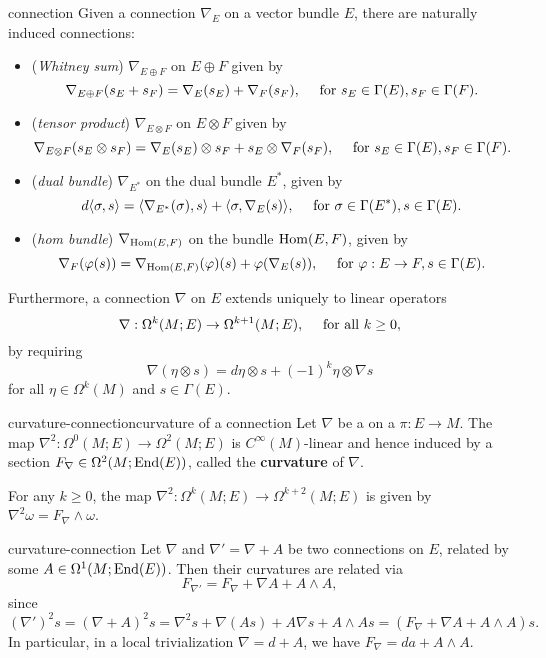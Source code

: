 \begin{example}{connection}
    Given a connection $\nabla_E$ on a vector bundle $E$, there are naturally induced connections:
    \begin{itemize}
        \item (\textit{Whitney sum}) $\nabla_{E \oplus F}$ on $E \oplus F$ given by
        \[ \nabla_{E \oplus F}(s_E + s_F) = \nabla_E(s_E) + \nabla_F(s_F), \quad \textup{ for } s_E \in \Gamma(E), s_F \in \Gamma(F) . \]
        \item (\textit{tensor product}) $\nabla_{E \otimes F}$ on $E \otimes F$ given by
        \[ \nabla_{E \otimes F}(s_E \otimes s_F) = \nabla_E(s_E) \otimes s_F + s_E \otimes \nabla_F(s_F), \quad \textup{ for } s_E \in \Gamma(E), s_F \in \Gamma(F) . \]
        \item (\textit{dual bundle}) $\nabla_{E^*}$ on the dual bundle $E^*$, given by
        \[ d \langle \sigma, s \rangle = \langle \nabla_{E^*} (\sigma), s \rangle + \langle \sigma, \nabla_E(s) \rangle, \quad \textup{ for } \sigma \in \Gamma(E^*), s \in \Gamma(E) . \]
        \item (\textit{hom bundle}) $\nabla_{\operatorname{Hom}(E, F)}$ on the bundle $\operatorname{Hom}(E, F)$, given by
        \[ \nabla_F(\varphi(s)) = \nabla_{\operatorname{Hom}(E, F)}(\varphi)(s) + \varphi(\nabla_E(s)), \quad \textup{ for } \varphi : E \to F, s \in \Gamma(E) . \]
    \end{itemize}
    Furthermore, a connection $\nabla$ on $E$ extends uniquely to linear operators
    \[ \nabla : \Omega^k(M; E) \to \Omega^{k + 1}(M; E), \quad \textup{ for all } k \ge 0,  \]
    by requiring
    \[ \nabla (\eta \otimes s) = d \eta \otimes s + (-1)^k \eta \otimes \nabla s \]
    for all $\eta \in \Omega^k(M)$ and $s \in \Gamma(E)$.
\end{example}

\begin{topic}{curvature-connection}{curvature of a connection}
    Let $\nabla$ be a  on a  $\pi : E \to M$. The map $\nabla^2 : \Omega^0(M; E) \to \Omega^2(M; E)$ is $C^\infty(M)$-linear and hence induced by a section $F_\nabla \in \Omega^2(M; \textup{End}(E))$, called the \textbf{curvature} of $\nabla$.
    
    For any $k \ge 0$, the map $\nabla^2 : \Omega^k(M; E) \to \Omega^{k + 2}(M; E)$ is given by $\nabla^2 \omega = F_\nabla \wedge \omega$.
\end{topic}

\begin{example}{curvature-connection}
    Let $\nabla$ and $\nabla' = \nabla + A$ be two connections on $E$, related by some $A \in \Omega^1(M; \textup{End}(E))$. Then their curvatures are related via
    \[ F_{\nabla'} = F_\nabla + \nabla A + A \wedge A , \]
    since
    \[ (\nabla')^2 s = (\nabla + A)^2 s = \nabla^2 s + \nabla (As) + A \nabla s + A \wedge A s = (F_\nabla + \nabla A + A \wedge A) s . \]
    In particular, in a local trivialization $\nabla = d + A$, we have $F_\nabla = da + A \wedge A$.
\end{example}

